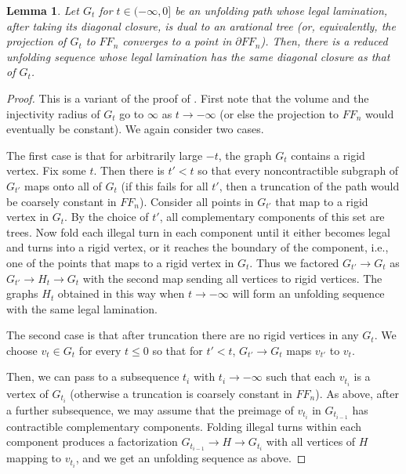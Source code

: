 \documentclass[11pt, letterpaper]{amsart}
\theoremstyle{plain}
\newtheorem{lemma}[theorem]{Lemma}
\theoremstyle{definition}
\begin{document}
\begin{lemma}
  Let $G_t$ for $t\in (-\infty,0]$  be an unfolding path whose legal
    lamination, after taking its diagonal closure, is dual to an arational tree (or,
    equivalently, the projection of $G_t$ to $FF_n$ converges to a point in $\partial FF_n$). Then,
    there is a reduced unfolding sequence whose legal lamination has the same diagonal closure as that of $G_t$.
\end{lemma}

\begin{proof}
  This is a variant of the proof of
  . First note that the volume and the injectivity radius
  of $G_t$ go to $\infty$ as $t\to -\infty$ (or else the projection to
  $FF_n$ would eventually be constant). We again consider two
  cases.

  The first case is that for arbitrarily large $-t$, the graph $G_{t}$
  contains a rigid vertex. Fix some $t$. Then there is $t'<t$ so that
  every noncontractible subgraph of $G_{t'}$ maps onto all of $G_t$
  (if this fails for all $t'$, then a truncation of the path would be coarsely constant in
  $FF_n$). Consider all points in $G_{t'}$ that map to a rigid vertex
  in $G_t$. By the choice of $t'$, all complementary components of this
  set are trees. Now fold each illegal turn in each component until
  it either becomes legal and turns into a rigid vertex, or it reaches
  the boundary of the component, i.e., one of the points that maps to a
  rigid vertex in $G_{t}$. Thus we factored $G_{t'}\to G_t$ as
  $G_{t'}\to H_t\to G_t$ with the second map sending all vertices to
  rigid vertices. The
  graphs $H_t$ obtained in this way when $t\to -\infty$ will form an
  unfolding sequence with the same legal lamination.

  The second case is that after truncation there are no rigid vertices
  in any $G_t$. We choose $v_t\in G_t$ for every $t\leq 0$ so that for $t'<t$,
  $G_{t'}\to G_t$ maps $v_{t'}$ to $v_t$.

  Then, we can pass to a subsequence $t_i$ with $t_i\to-\infty$ such that each $v_{t_i}$ is a vertex of $G_{t_i}$ 
  (otherwise a truncation
  is coarsely constant in $FF_n$). As above, after a further
  subsequence, we may assume that the preimage of $v_{t_i}$ in
  $G_{t_{i-1}}$ has contractible complementary components. Folding
  illegal turns within each component produces a factorization
  $G_{t_{i-1}}\to H\to G_{t_i}$ with all vertices of $H$ mapping to
  $v_{t_i}$, and we get an unfolding sequence as above.


\end{proof}
\end{document}
